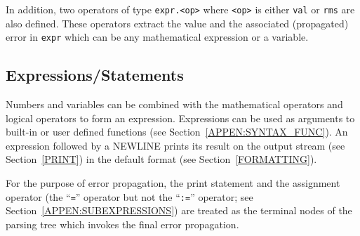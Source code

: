 \documentclass[12pt]{article}
\begin{document}
In addition, two operators of type {\tt expr.<op>} where {\tt <op>} is
either {\tt val} or {\tt rms} are also defined.  These operators
extract the value and the associated (propagated) error in {\tt expr}
which can be any mathematical expression or a variable.


\subsection{Expressions/Statements}
\label{APPEN:SYNTAX_EXPR}

Numbers and variables can be combined with the mathematical operators
and logical operators to form an expression.  Expressions can be used
as arguments to built-in or user defined functions (see
Section~\ref{APPEN:SYNTAX_FUNC}).  An expression followed by a NEWLINE
prints its result on the output stream (see Section~\ref{PRINT}) in
the default format (see Section~\ref{FORMATTING}).

For the purpose of error propagation, the print statement and the
assignment operator (the ``{\tt =}'' operator but not the ``{\tt :=}''
operator; see Section~\ref{APPEN:SUBEXPRESSIONS}) are treated as the
terminal nodes of the parsing tree which invokes the final error
propagation.
\end{document}

